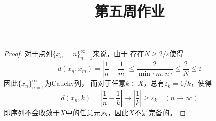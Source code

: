 \documentclass[cn]{homework}
\title{第五周作业}
\begin{document}
    \maketitle

    \problem
    \begin{proof}
        对于点列$\{x_n=n\}_{n=1}^\infty$来说，由于
        存在$N\geq 2/\varepsilon$使得
        \[d(x_n,x_m)=\left|\frac{1}{n}-\frac{1}{m}\right|
        \leq\frac{2}{\min\{m,n\}}
        \leq\frac{2}{N}
        \leq\varepsilon\]
        因此$\{x_n\}_{n=1}^\infty$为Cauchy列，
        而对于任意$k\in X$，总有$\varepsilon_k=1/k$，使得
        \[d(x_n,k)=\left|\frac{1}{n}-\frac{1}{k}\right|
        \to\left|\frac{1}{k}\right|\geq\varepsilon_k
        \quad(n\to\infty)\]
        即序列不会收敛于$X$中的任意元素，因此$X$不是完备的。
    \end{proof}
\end{document}
